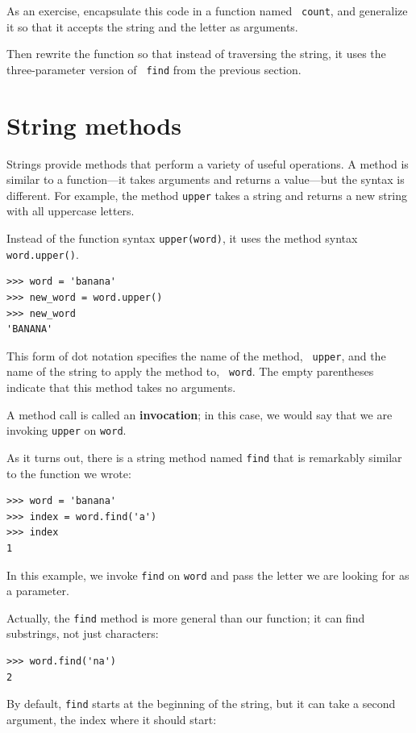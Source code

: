 \documentclass[10pt]{book}
\begin{document}
As an exercise, encapsulate this code in a function named {\tt
count}, and generalize it so that it accepts the string and the
letter as arguments.

Then rewrite the function so that instead of
traversing the string, it uses the three-parameter version of {\tt
find} from the previous section.


\section{String methods}
\label{optional}

Strings provide methods that perform a variety of useful operations.
A method is similar to a function---it takes arguments and
returns a value---but the syntax is different.  For example, the
method {\tt upper} takes a string and returns a new string with
all uppercase letters.

Instead of the function syntax {\tt upper(word)}, it uses
the method syntax {\tt word.upper()}.

\begin{verbatim}
>>> word = 'banana'
>>> new_word = word.upper()
>>> new_word
'BANANA'
\end{verbatim}
%
This form of dot notation specifies the name of the method, {\tt
upper}, and the name of the string to apply the method to, {\tt
word}.  The empty parentheses indicate that this method takes no
arguments.

A method call is called an {\bf invocation}; in this case, we would
say that we are invoking {\tt upper} on {\tt word}.

As it turns out, there is a string method named {\tt find} that
is remarkably similar to the function we wrote:

\begin{verbatim}
>>> word = 'banana'
>>> index = word.find('a')
>>> index
1
\end{verbatim}
%
In this example, we invoke {\tt find} on {\tt word} and pass
the letter we are looking for as a parameter.

Actually, the {\tt find} method is more general than our function;
it can find substrings, not just characters:

\begin{verbatim}
>>> word.find('na')
2
\end{verbatim}
%
By default, {\tt find} starts at the beginning of the string, but
it can take a second argument, the index where it should start:
\end{document}
